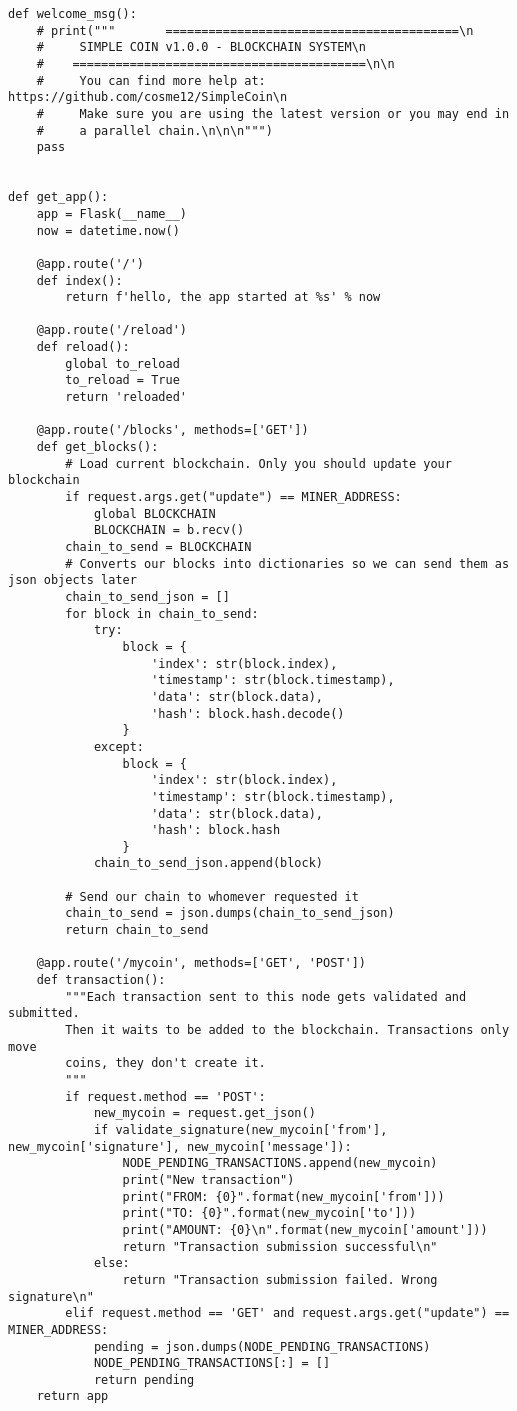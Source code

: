 \begin{lstlisting}
def welcome_msg():
    # print("""       =========================================\n
    #     SIMPLE COIN v1.0.0 - BLOCKCHAIN SYSTEM\n
    #    =========================================\n\n
    #     You can find more help at: https://github.com/cosme12/SimpleCoin\n
    #     Make sure you are using the latest version or you may end in
    #     a parallel chain.\n\n\n""")
    pass


def get_app():
    app = Flask(__name__)
    now = datetime.now()

    @app.route('/')
    def index():
        return f'hello, the app started at %s' % now

    @app.route('/reload')
    def reload():
        global to_reload
        to_reload = True
        return 'reloaded'

    @app.route('/blocks', methods=['GET'])
    def get_blocks():
        # Load current blockchain. Only you should update your blockchain
        if request.args.get("update") == MINER_ADDRESS:
            global BLOCKCHAIN
            BLOCKCHAIN = b.recv()
        chain_to_send = BLOCKCHAIN
        # Converts our blocks into dictionaries so we can send them as json objects later
        chain_to_send_json = []
        for block in chain_to_send:
            try:
                block = {
                    'index': str(block.index),
                    'timestamp': str(block.timestamp),
                    'data': str(block.data),
                    'hash': block.hash.decode()
                }
            except:
                block = {
                    'index': str(block.index),
                    'timestamp': str(block.timestamp),
                    'data': str(block.data),
                    'hash': block.hash
                }
            chain_to_send_json.append(block)

        # Send our chain to whomever requested it
        chain_to_send = json.dumps(chain_to_send_json)
        return chain_to_send

    @app.route('/mycoin', methods=['GET', 'POST'])
    def transaction():
        """Each transaction sent to this node gets validated and submitted.
        Then it waits to be added to the blockchain. Transactions only move
        coins, they don't create it.
        """
        if request.method == 'POST':
            new_mycoin = request.get_json()
            if validate_signature(new_mycoin['from'], new_mycoin['signature'], new_mycoin['message']):
                NODE_PENDING_TRANSACTIONS.append(new_mycoin)
                print("New transaction")
                print("FROM: {0}".format(new_mycoin['from']))
                print("TO: {0}".format(new_mycoin['to']))
                print("AMOUNT: {0}\n".format(new_mycoin['amount']))
                return "Transaction submission successful\n"
            else:
                return "Transaction submission failed. Wrong signature\n"
        elif request.method == 'GET' and request.args.get("update") == MINER_ADDRESS:
            pending = json.dumps(NODE_PENDING_TRANSACTIONS)
            NODE_PENDING_TRANSACTIONS[:] = []
            return pending
    return app



\end{lstlisting}
